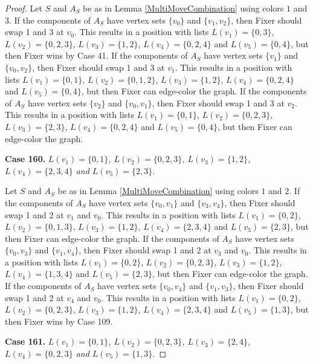 \documentclass[12pt]{amsart}
\theoremstyle{plain}
\theoremstyle{definition}
\theoremstyle{remark}
\begin{document}
\begin{proof}
Let $S$ and $A_S$ be as in Lemma \ref{MultiMoveCombination} using colors $1$ and $3$. If the components of $A_S$ have vertex sets $\{v_0\}$ and $\{v_1, v_2\}$, then Fixer should swap 1 and 3 at $v_0$. This results in a position with lists $L(v_1) = \{0, 3\}$, $L(v_2) = \{0, 2, 3\}$, $L(v_3) = \{1, 2\}$, $L(v_4) = \{0, 2, 4\}$ and $L(v_5) = \{0, 4\}$, but then Fixer wins by Case 41.
If the components of $A_S$ have vertex sets $\{v_1\}$ and $\{v_0, v_2\}$, then Fixer should swap 1 and 3 at $v_1$. This results in a position with lists $L(v_1) = \{0, 1\}$, $L(v_2) = \{0, 1, 2\}$, $L(v_3) = \{1, 2\}$, $L(v_4) = \{0, 2, 4\}$ and $L(v_5) = \{0, 4\}$, but then Fixer can edge-color the graph.
If the components of $A_S$ have vertex sets $\{v_2\}$ and $\{v_0, v_1\}$, then Fixer should swap 1 and 3 at $v_2$. This results in a position with lists $L(v_1) = \{0, 1\}$, $L(v_2) = \{0, 2, 3\}$, $L(v_3) = \{2, 3\}$, $L(v_4) = \{0, 2, 4\}$ and $L(v_5) = \{0, 4\}$, but then Fixer can edge-color the graph.

\noindent\textbf{Case 160.  }\textit{$L(v_1) = \{0, 1\}$, $L(v_2) = \{0, 2, 3\}$, $L(v_3) = \{1, 2\}$, $L(v_4) = \{2, 3, 4\}$ and $L(v_5) = \{2, 3\}$.}

Let $S$ and $A_S$ be as in Lemma \ref{MultiMoveCombination} using colors $1$ and $2$. If the components of $A_S$ have vertex sets $\{v_0, v_1\}$ and $\{v_3, v_4\}$, then Fixer should swap 1 and 2 at $v_1$ and $v_0$. This results in a position with lists $L(v_1) = \{0, 2\}$, $L(v_2) = \{0, 1, 3\}$, $L(v_3) = \{1, 2\}$, $L(v_4) = \{2, 3, 4\}$ and $L(v_5) = \{2, 3\}$, but then Fixer can edge-color the graph.
If the components of $A_S$ have vertex sets $\{v_0, v_3\}$ and $\{v_1, v_4\}$, then Fixer should swap 1 and 2 at $v_3$ and $v_0$. This results in a position with lists $L(v_1) = \{0, 2\}$, $L(v_2) = \{0, 2, 3\}$, $L(v_3) = \{1, 2\}$, $L(v_4) = \{1, 3, 4\}$ and $L(v_5) = \{2, 3\}$, but then Fixer can edge-color the graph.
If the components of $A_S$ have vertex sets $\{v_0, v_4\}$ and $\{v_1, v_3\}$, then Fixer should swap 1 and 2 at $v_4$ and $v_0$. This results in a position with lists $L(v_1) = \{0, 2\}$, $L(v_2) = \{0, 2, 3\}$, $L(v_3) = \{1, 2\}$, $L(v_4) = \{2, 3, 4\}$ and $L(v_5) = \{1, 3\}$, but then Fixer wins by Case 109.

\noindent\textbf{Case 161.  }\textit{$L(v_1) = \{0, 1\}$, $L(v_2) = \{0, 2, 3\}$, $L(v_3) = \{2, 4\}$, $L(v_4) = \{0, 2, 3\}$ and $L(v_5) = \{1, 3\}$.}


\end{proof}
\end{document}
